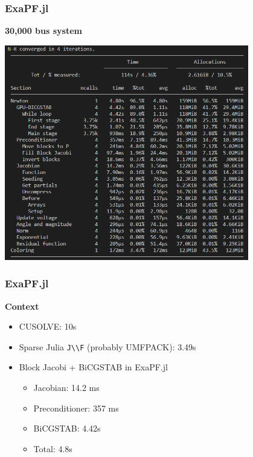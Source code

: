 \begin{frame}[fragile]
  \frametitle{ExaPF.jl}
  {\bf 30,000 bus system}
  \begin{center}
   \includegraphics[width=0.8\textwidth]{figures/timings}
  \end{center}
\end{frame}

\begin{frame}
  \frametitle{ExaPF.jl}
  {\bf Context}
  \begin{itemize}
    \item CUSOLVE: 10s 
    \item Sparse Julia \lstinline{J\\F} (probably UMFPACK): 3.49s 
    \item Block Jacobi + BiCGSTAB in ExaPF.jl
    \begin{itemize}
      \item Jacobian: 14.2 ms
      \item Preconditioner: 357 ms
      \item BiCGSTAB: 4.42s
      \item Total: 4.8s
    \end{itemize}
  \end{itemize}
\end{frame}

